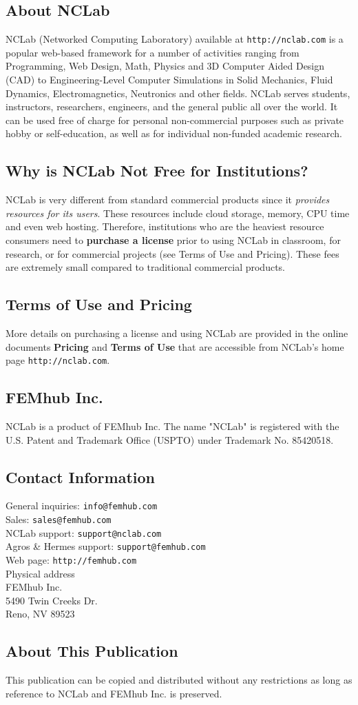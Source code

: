 \subsection*{About NCLab}
NCLab (Networked Computing Laboratory) available at {\tt http://nclab.com} is a popular web-based 
framework for a number of activities ranging from Programming, Web Design, Math, Physics and
3D Computer Aided Design (CAD) to Engineering-Level Computer Simulations in Solid Mechanics,
Fluid Dynamics, Electromagnetics, Neutronics and other fields. NCLab serves students, 
instructors, researchers, engineers, and the general public all over the world. It can be 
used free of charge for personal non-commercial purposes such as private hobby or self-education, 
as well as for individual non-funded academic research.

\noindent
\subsection*{Why is NCLab Not Free for Institutions?}
NCLab is very different from standard commercial products since it {\em provides resources for 
its users}. These resources include cloud storage, memory, CPU time and even web hosting.
Therefore, institutions who are the heaviest resource consumers need to {\bf purchase a license} 
prior to using NCLab in classroom, for research, or for commercial projects (see Terms of Use and 
Pricing). These fees are extremely small compared to traditional commercial products. 

\subsection*{Terms of Use and Pricing}
More details on purchasing a license and using NCLab are provided in the online documents 
{\bf Pricing} and {\bf Terms of Use} that are accessible from NCLab's home page 
{\tt http://nclab.com}.

\subsection*{FEMhub Inc.}

NCLab is a product of FEMhub Inc. The name "NCLab" is 
registered with the U.S. Patent and Trademark Office (USPTO) under Trademark No. 85420518.

\subsection*{Contact Information}
General inquiries: {\tt info@femhub.com}\\
Sales: {\tt sales@femhub.com}\\
NCLab support: {\tt support@nclab.com}\\
Agros \& Hermes support: {\tt support@femhub.com}\\
Web page: {\tt http://femhub.com}\\
{Physical address}\\
FEMhub Inc.\\
5490 Twin Creeks Dr.\\
Reno, NV 89523

\subsection*{About This Publication}
This publication can be copied and distributed without any restrictions
as long as reference to NCLab and FEMhub Inc. is preserved.
